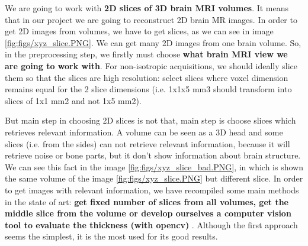 We are going to work with \textbf{2D slices of 3D brain MRI volumes}. It means that  in our project we are going to reconstruct 2D brain MR images. In order to get 2D images from volumes, we have to get slices, as we can see in image \ref{fig:figs/xyz_slice.PNG}. We can get many 2D images from one brain volume. So, in the  preprocessing step, we firstly must choose \textbf{what brain MRI view we are going to work with}. For non-isotropic acquisitions, we should ideally slice them so that the slices are high resolution: select slices where voxel dimension remains equal for the 2 slice dimensions (i.e. 1x1x5 mm3 should transform into slices of 1x1 mm2 and not 1x5 mm2).

But main step in choosing 2D slices is not that, main step is choose slices which retrieves relevant information. A volume can be seen as a 3D head and some slices (i.e. from the sides) can not retrieve relevant information, because it will retrieve noise or bone parts, but it don't show information about brain structure. We can see this fact in the image \ref{fig:figs/xyz_slice_bad.PNG}, in which is shown the same volume of the image \ref{fig:figs/xyz_slice.PNG} but different slice. In order to get images with relevant information, we have recompiled some main methods in the state of art: \textbf{get fixed number of slices from all volumes, get the middle slice from the volume or develop ourselves a computer vision tool to evaluate the thickness (with opencv)  }. Although the first approach seems the simplest, it is the most used for its good results.




